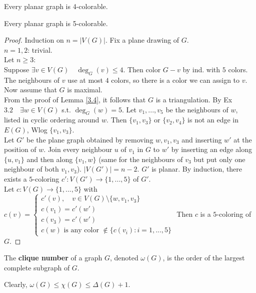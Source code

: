 \begin{theorem}\label{5.6}
    Every planar graph is 4-colorable.
\end{theorem}
\begin{theorem}\label{5.7}
    Every planar graph is 5-colorable.
\end{theorem}
\begin{proof}
    Induction on $n=|V(G)|$. Fix a plane drawing of $G$.\\
    $n=1,2$: trivial.\\
    Let $n\geq 3$:\\
    Suppose $\exists v\in V(G)\quad \deg_G(v)\leq 4$. Then color $G-v$ by ind. with $5$ colors. The neighbours of $v$ use at most $4$ colors, so there is a color we can assign to $v$.\\
    Now assume that $G$ is maximal.\\
    From the proof of Lemma \ref{3.4}, it follows that $G$ is a triangulation. By Ex $3.2\quad\exists w\in V(G)$ s.t. $\deg_G(w)=5$. Let $v_1,...,v_5$ be the neighbours of $w$, listed in cyclic ordering around $w$. Then $\{v_1,v_3\}$ or $\{v_2,v_4\}$ is not an edge in $E(G)$, Wlog $\{v_1,v_3\}$.\\
    Let $G'$ be the plane graph obtained by removing $w,v_1,v_3$ and inserting $w'$ at the position of $w$. Join every neighbour $u$ of $v_1$ in $G$ to $w'$ by inserting an edge along $\{u,v_1\}$ and then along $\{v_1,w\}$ (same for the neighbours of $v_3$ but put only one neighbour of both $v_1,v_3$). $|V(G')|=n-2$. $G'$ is planar. By induction, there exists a $5$-coloring $c':V(G')\to \{1,...,5\}$ of $G'$.\\
    Let $c:V(G)\to\{1,...,5\}$ with $c(v)=\begin{cases}
        c'(v), \quad v\in V(G)\setminus \{w,v_1,v_3\} \\
        c(v_1)=c'(w')\\
        c(v_3)=c'(w')\\
        c(w) \text{ is any color } \notin \{c(v_i): i=1,...,5\}
    \end{cases}$
    Then $c$ is a $5$-coloring of $G$.
\end{proof}
\begin{definition}\label{5.8}
    The \textbf{clique number} of a graph $G$, denoted $\omega(G)$, is the order of the largest complete subgraph of $G$.
\end{definition}
\begin{remark}\label{5.9}
    Clearly, $\omega(G)\leq \chi(G)\leq\Delta(G)+1$.
\end{remark}
